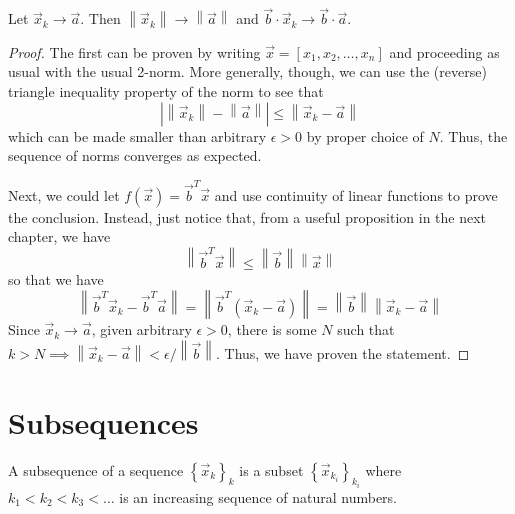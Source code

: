 \begin{prop}
Let $\vec{x}_k \rightarrow \vec{a}$. Then $\left\lVert \vec{x}_k \right\rVert \rightarrow \left\lVert \vec{a} \right\rVert$ and $\vec{b}\cdot \vec{x}_k \rightarrow \vec{b}\cdot \vec{a}$.
\end{prop}
\begin{proof}
The first can be proven by writing $\vec{x} = \left[ x_1, x_2,\ldots,x_n\right]$ and proceeding as usual with the usual 2-norm. More generally, though, we can use the (reverse) triangle inequality property of the norm to see that \[ \left| \left\lVert \vec{x}_k \right\rVert - \left\lVert \vec{a} \right\rVert \right| \leq \left\lVert \vec{x}_k - \vec{a} \right\rVert \] which can be made smaller than arbitrary $\epsilon > 0$ by proper choice of $N$. Thus, the sequence of norms converges as expected.

Next, we could let $f\left(\vec{x} \right) = \vec{b}^T \vec{x}$ and use continuity of linear functions to prove the conclusion. Instead, just notice that, from a useful proposition in the next chapter, we have \[ \left\lVert \vec{b}^T \vec{x} \right\rVert \leq \left\lVert \vec{b} \right\rVert \left\lVert \vec{x}\right\rVert \] so that we have \[ \left\lVert \vec{b}^T \vec{x}_k - \vec{b}^T \vec{a} \right\rVert = \left\lVert \vec{b}^T \left( \vec{x}_k-\vec{a} \right) \right\rVert = \left\lVert \vec{b} \right\rVert \left\lVert \vec{x}_k - \vec{a} \right\rVert \] Since $\vec{x}_k \rightarrow \vec{a}$, given arbitrary $\epsilon >0$, there is some $N$ such that $k>N \implies \left\lVert \vec{x}_k -\vec{a} \right\rVert < \epsilon / \left\lVert \vec{b} \right\rVert $. Thus, we have proven the statement.

\end{proof}



\section{Subsequences}
A subsequence of a sequence $\left\{ \vec{x}_k\right\}_{k}$ is a subset $\left\{ \vec{x}_{k_i} \right\}_{k_i}$ where $k_1 < k_2 < k_3 < \ldots$ is an increasing sequence of natural numbers. 

